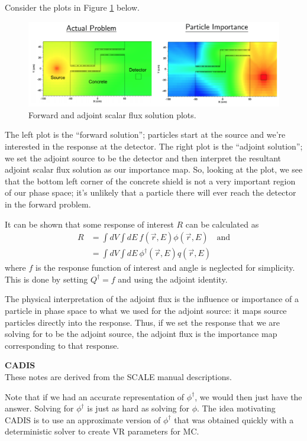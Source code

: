 \documentclass[12pt]{article}
\begin{document}
Consider the plots in Figure \ref{fwd-adj} below.

\begin{figure}[!htb]
\centering
\includegraphics[width=\textwidth]{fig/fwd-adj.png}
\caption{Forward and adjoint scalar flux solution plots.}
\label{fwd-adj}
\end{figure}

The left plot is the ``forward solution''; particles start at the source and
we're interested in the response at the detector. The right plot is the
``adjoint solution''; we set the adjoint source to be the detector and then
interpret the resultant adjoint scalar flux solution as our importance map.
So, looking at the plot, we see that the bottom left corner of the concrete
shield is not a very important region of our phase space; it's unlikely that
a particle there will ever reach the detector in the forward problem.

It can be shown that some response of interest $R$ can be calculated as
\begin{align*}
R &= \int dV \int dE\: f(\vec{r}, E) \phi(\vec{r}, E) \quad \text{and}\\
&= \int dV \int dE\: \phi^{\dagger}(\vec{r}, E) q(\vec{r}, E)
\end{align*}
where $f$ is the response function of interest and angle is neglected for
simplicity. This is done by setting $Q^{\dagger} = f$ and using the adjoint
identity.

The physical interpretation of the adjoint flux is the influence or importance
of a particle in phase space to what we used for the adjoint source: it maps
source particles directly into the response.
Thus, if we set the response that we are solving for to be the adjoint source,
the adjoint flux is the importance map corresponding to that response. 

\textbf{CADIS}\\
These notes are derived from the SCALE manual descriptions. 

Note that if we had an accurate representation of $\phi^{\dagger}$, we would
then just have the answer. Solving for $\phi^{\dagger}$ is just as hard as
solving for $\phi$. The idea motivating CADIS is to use an approximate version
of $\phi^{\dagger}$ that was obtained quickly with a deterministic solver to
create VR parameters for MC. 
\end{document}
